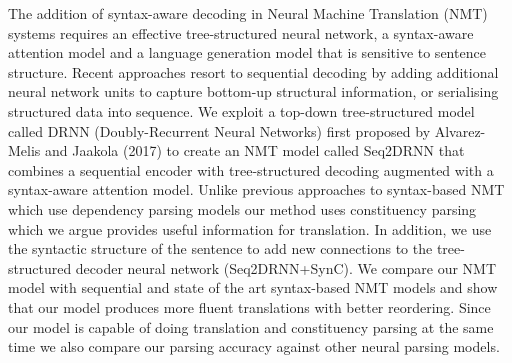 The addition of syntax-aware decoding in Neural Machine Translation (NMT) systems requires an effective tree-structured neural network, a syntax-aware attention model and a language generation model that is sensitive to sentence structure. Recent approaches resort to sequential decoding by adding additional neural network units to capture bottom-up structural information, or serialising structured data into sequence. We exploit a top-down tree-structured model called DRNN (Doubly-Recurrent Neural Networks) first proposed by Alvarez-Melis and Jaakola (2017) to create an NMT model called Seq2DRNN that combines a sequential encoder with tree-structured decoding augmented with a syntax-aware attention model. Unlike previous approaches to syntax-based NMT which use dependency parsing models our method uses constituency parsing which we argue provides useful information for translation. In addition, we use the syntactic structure of the sentence to add new connections to the tree-structured decoder neural network (Seq2DRNN+SynC). We compare our NMT model with sequential and state of the art syntax-based NMT models and show that our model produces more fluent translations with better reordering. Since our model is capable of doing translation and constituency parsing at the same time we also compare our parsing accuracy against other neural parsing models.

